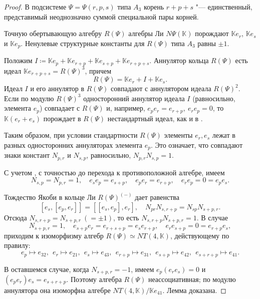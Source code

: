 \documentclass[a4paper,14pt,oneside,openany]{memoir}
\begin{document}
\begin{proof}
    В подсистеме $\Psi=\Psi(r,p,s)$ типа $A_3$ корень $r+p+s$ "--- единственный,
    представимый неоднозначно суммой специальной пары корней.

    Точную обертывающую алгебру $R(\Psi)$ алгебры Ли $N\Psi(\mathbb{K})$ порождают
    $\mathbb{K}e_r$, $\mathbb{K}e_s$ и $\mathbb{K}e_p$. Ненулевые структурные
    константы для $R(\Psi)$ типа $A_3$ равны $\pm 1$.

    Положим $I\coloneq\mathbb{K}e_p+\mathbb{K}e_{r+p}+\mathbb{K}e_{s+p}
    +\mathbb{K}e_{r+p+s}$. Аннулятор кольца $R(\Psi)$ есть идеал
    $\mathbb{K}e_{r+p+s}=R(\Psi)^3$, причем
    \[
        R(\Psi)=\mathbb{K}e_r+I+\mathbb{K}e_s.
    \]
    Идеал $I$ и его аннулятор в $R(\Psi)$ совпадают с аннулятором идеала
    $R(\Psi)^2$. Если по модулю $ R(\Psi)^3$ односторонний аннулятор идеала $I$
    (равносильно, элемента $e_p$) совпадает с $R(\Psi)$ и, например, $e_p
    e_r=e_{r+p},\ e_re_p=0$, то $\mathbb{K}(e_r+ e_s)$ порождает в $R(\Psi)$
    нестандартный идеал, как и в .

    Таким образом, при условии стандартности $R(\Psi)$ элементы $e_r, e_s$ лежат в
    разных односторонних аннуляторах элемента $e_p$. Это означает, что совпадают
    знаки констант $N_{p,r}$ и $N_{s,p}$, равносильно, $N_{p,r} N_{s,p}=1$.

    С учетом , с точностью до перехода к противоположной
    алгебре, имеем
    \begin{equation}\label{eq:An-Nsp-Npr-1}
        N_{s,p} =N_{p,r}=1,\quad
        e_se_p=e_{s+p},\quad
        e_pe_r=e_{r+p},\quad
        e_re_p=0=e_pe_s.
    \end{equation}

    Тождество Якоби в кольце Ли $R(\Psi)^{(-)}$ дает равенства
    \[
        [e_s,[e_p,e_r]] = [[e_s,e_p],e_r],\quad N_{pr}N_{s,r+p}=N_{sp}N_{s+p,r}.
    \]
    Отсюда $N_{s,r+p}=N_{s+p,r}\ (=\pm 1)$, то есть $N_{s,r+p}N_{s+p,r} = 1$. В
    случае
    \begin{equation*}
        N_{s+p,r} = 1, \quad
        e_{s+p}e_r=e_{r+s+p}=e_{s}e_{r+p}, \quad
        e_re_{s+p}=0=e_{r+p}e_s,
    \end{equation*}
    приходим к изоморфизму алгебр $R(\Psi)\simeq NT(4,\mathbb{K})$, действующему по правилу:
    \[
        e_p \mapsto e_{32}, \ \ e_r \mapsto e_{21}, \ \ e_s \mapsto
        e_{43}, \ \ e_{r+p} \mapsto e_{31}, \ \ e_{s+p} \mapsto e_{42}, \
        \ e_{s+r+p } \mapsto e_{41}.
    \]

    В оставшемся случае, когда $N_{s+p,r} = -1$, имеем $e_p(e_re_s)=0$ и
    $(e_pe_r)e_s = e_{s+r+p}$. Поэтому алгебра $R(\Psi)$ неассоциативная; по модулю
    аннулятора она изоморфна алгебре $NT(4,\mathbb{K})/\mathbb{K}e_{41}$. Лемма
    доказана.
\end{proof}
\end{document}
